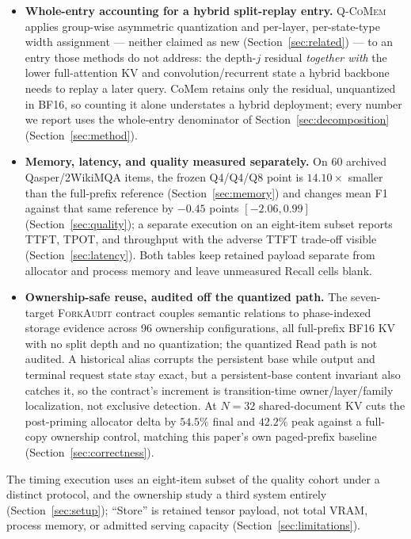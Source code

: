 \documentclass{article}
\newcommand{\qcomem}{\textsc{Q-CoMem}}
\newcommand{\method}{\textsc{ForkAudit}}
\begin{document}
\begin{itemize}
  \setlength{\itemsep}{1pt}
  \setlength{\parskip}{0pt}
  \item \textbf{Whole-entry accounting for a hybrid split-replay entry.}
\qcomem{} applies group-wise asymmetric quantization and per-layer,
per-state-type width assignment --- neither claimed as new
(Section~\ref{sec:related}) --- to an entry those methods do not address: the
depth-$j$ residual \emph{together with} the lower full-attention KV and
convolution/recurrent state a hybrid backbone needs to replay a later query.
CoMem retains only the residual, unquantized in BF16, so counting it alone
understates a hybrid deployment; every number we report uses the whole-entry
denominator of Section~\ref{sec:decomposition} (Section~\ref{sec:method}).
  \item \textbf{Memory, latency, and quality measured separately.} On 60 archived
Qasper/2WikiMQA items, the frozen Q4/Q4/Q8 point is $14.10\times$ smaller than
the full-prefix reference (Section~\ref{sec:memory}) and changes mean F1
against that same reference by $-0.45$ points $[-2.06,0.99]$
(Section~\ref{sec:quality}); a separate execution on an eight-item subset
reports TTFT, TPOT, and throughput with the adverse TTFT trade-off visible
(Section~\ref{sec:latency}). Both tables keep retained payload separate from
allocator and process memory and leave unmeasured Recall cells blank.
  \item \textbf{Ownership-safe reuse, audited off the quantized path.} The
seven-target \method{} contract couples semantic relations to phase-indexed
storage evidence across 96 ownership configurations, all full-prefix BF16 KV
with no split depth and no quantization; the quantized Read path is not
audited. A historical alias corrupts the persistent base while output and
terminal request state stay exact, but a persistent-base content invariant also
catches it, so the contract's increment is transition-time owner/layer/family
localization, not exclusive detection. At $N=32$ shared-document KV cuts the
post-priming allocator delta by $54.5\%$ final and $42.2\%$ peak against a
full-copy ownership control, matching this paper's own paged-prefix baseline
(Section~\ref{sec:correctness}).
\end{itemize}

The timing execution uses an eight-item subset of the quality cohort under a
distinct protocol, and the ownership study a third system entirely
(Section~\ref{sec:setup}); ``Store'' is retained tensor payload, not total
VRAM, process memory, or admitted serving capacity
(Section~\ref{sec:limitations}).
\end{document}

